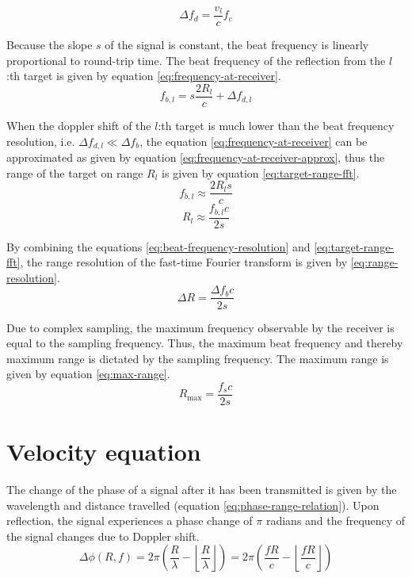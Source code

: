 \begin{equation}
    \label{eq:beat-frequency-doppler}
    \Delta f_{d} = \frac{v_{l}}{c}f_{c}
\end{equation}

Because the slope $s$ of the signal is constant,
the beat frequency is linearly proportional to round-trip time.
The beat frequency of the reflection from the $l$:th target 
is given by equation \ref{eq:frequency-at-receiver}.
\begin{equation}
    \label{eq:frequency-at-receiver}
    f_{b, l} = s \frac{2 R_{l}}{c} + \Delta f_{d, l}
\end{equation}

When the doppler shift of the $l$:th target is much lower than the beat frequency resolution, 
i.e. $\Delta f_{d,l} \ll \Delta f_{b}$, the equation \ref{eq:frequency-at-receiver} can be approximated
as given by equation \ref{eq:frequency-at-receiver-approx},
thus the range of the target on range $R_{l}$ is given by equation \ref{eq:target-range-fft}.
\begin{equation}
    \label{eq:frequency-at-receiver-approx}
    f_{b, l} \approx \frac{2 R_{l} s}{c}
\end{equation}
\begin{equation}
    \label{eq:target-range-fft}
    R_{l} \approx \frac{f_{b,l} c}{2s}
\end{equation}

By combining the equations \ref{eq:beat-frequency-resolution} and \ref{eq:target-range-fft},
the range resolution of the fast-time Fourier transform is given by \ref{eq:range-resolution}.
\begin{equation}
    \label{eq:range-resolution}
    \Delta R = \frac{\Delta f_{b} c}{2s}
\end{equation}

Due to complex sampling, the maximum frequency observable by the receiver is
equal to the sampling frequency. Thus, the maximum beat frequency and thereby maximum range is dictated
by the sampling frequency. The maximum range is given by equation \ref{eq:max-range}.
\begin{equation}
    \label{eq:max-range}
    R_{\mathrm{max}} = \frac{f_{s} c}{2s}
\end{equation}

\section{Velocity equation}
The change of the phase of a signal after it has been transmitted
is given by the wavelength and distance travelled (equation \ref{eq:phase-range-relation}).
Upon reflection, the signal experiences a phase change of $\pi$ radians and the frequency of the signal
changes due to Doppler shift.
\begin{equation}
    \label{eq:phase-range-relation}
    \Delta \phi (R, f) = 2\pi \left( \frac{R}{\lambda} - \left\lfloor \frac{R}{\lambda} \right\rfloor \right)
    = 2\pi \left( \frac{fR}{c} - \left\lfloor \frac{fR}{c} \right\rfloor \right)
\end{equation}

